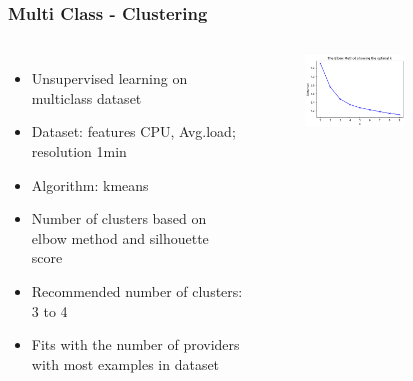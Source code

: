 \documentclass[aspectratio=169,11pt,hyperref={colorlinks=true}]{beamer}
\begin{document}
\begin{frame}
    \frametitle{Multi Class - Clustering}
    \begin{columns}
      \begin{itemize}
          \item{Unsupervised learning on multiclass dataset}
          \item{Dataset: features CPU, Avg.load; resolution 1min}
          \item{Algorithm: kmeans}
          \item{Number of clusters based on elbow method and silhouette score}
          \item{Recommended number of clusters: 3 to 4}
          \item{Fits with the number of providers with most examples in dataset}
      \end{itemize}
        \begin{center}
          \begin{table}[h!]
            \begin{center}
            \end{center}
         \end{table}
         \begin{figure}
           \includegraphics[width=0.6\textwidth]{graphs/elbow_method_multiclass.png}
          \end{figure}
        \end{center}
  \end{columns}
\end{frame}
\end{document}
